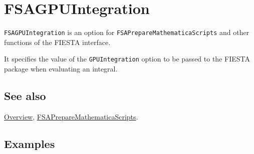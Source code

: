 \documentclass[../FeynHelpersManual.tex]{subfiles}
\begin{document}
\hypertarget{fsagpuintegration}{
\section{FSAGPUIntegration}\label{fsagpuintegration}}

\texttt{FSAGPUIntegration} is an option for
\texttt{FSAPrepareMathematicaScripts} and other functions of the FIESTA
interface.

It specifies the value of the \texttt{GPUIntegration} option to be
passed to the FIESTA package when evaluating an integral.

\subsection{See also}

\hyperlink{toc}{Overview},
\hyperlink{fsapreparemathematicascripts}{FSAPrepareMathematicaScripts}.

\subsection{Examples}
\end{document}
